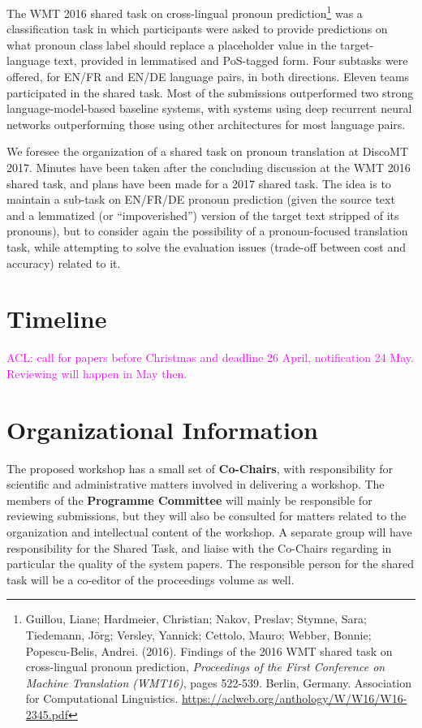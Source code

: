 \documentclass[11pt]{article}
\begin{document}
The WMT 2016 shared task on cross-lingual pronoun prediction\footnote{Guillou, Liane; Hardmeier, Christian; Nakov, Preslav; Stymne, Sara; Tiedemann, Jörg; Versley, Yannick; Cettolo, Mauro; Webber, Bonnie; Popescu-Belis, Andrei. (2016).  Findings of the 2016 WMT shared task on cross-lingual pronoun prediction, \textit{Proceedings of the First Conference on Machine Translation (WMT16)}, pages 522-539.  Berlin, Germany. Association for Computational Linguistics. \url{https://aclweb.org/anthology/W/W16/W16-2345.pdf}}
was a  classification  task  in which  participants  were  asked  to  provide predictions  on  what  pronoun  class  label should replace a placeholder value in the target-language  text,  provided  in  lemmatised and PoS-tagged form.  Four subtasks were offered, for EN/FR and EN/DE language  pairs,  in  both directions.   Eleven  teams  participated  in the  shared  task. Most of the submissions outperformed two strong language-model-based baseline systems, with systems using deep recurrent neural networks outperforming those using other architectures for most language pairs.

We foresee the organization of a shared task on pronoun translation at DiscoMT 2017.  Minutes have been taken after the concluding discussion at the WMT 2016 shared task, and plans have been made for a 2017 shared task.  The idea is to maintain a sub-task on EN/FR/DE pronoun prediction (given the source text and a lemmatized (or ``impoverished'') version of the target text stripped of its pronouns), but to consider again the possibility of a pronoun-focused translation task, while attempting to solve the evaluation issues (trade-off between cost and accuracy) related to it.

\section{Timeline}

\textcolor{magenta}{ACL: call for papers before Christmas and deadline 26 April, notification 24 May. Reviewing will happen in May then.} 

\section{Organizational Information}

The proposed workshop has a small set of \textbf{Co-Chairs}, with responsibility
for scientific and administrative matters involved in delivering a workshop.  The members of 
the \textbf{Programme Committee} will mainly be responsible for reviewing submissions, but 
they will also be consulted for matters related to the organization and
intellectual content of the workshop.  A separate group will have responsibility for the Shared Task,
and liaise with the Co-Chairs regarding in particular the quality of the system papers.  The responsible
person for the shared task will be a co-editor of the proceedings volume as well.
\end{document}
